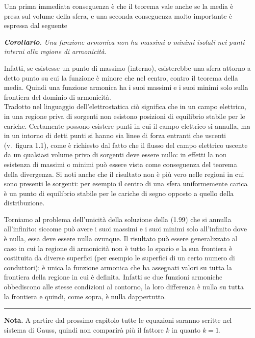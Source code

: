 Una prima immediata conseguenza \`e che il teorema vale anche se la media \`e
presa sul volume della sfera, e una seconda conseguenza molto importante \`e
espressa dal seguente

\textbf{\textit{Corollario.}} \textit{Una funzione armonica non ha massimi o
minimi isolati nei punti interni alla regione di armonicit\`a.}

Infatti, se esistesse un punto di massimo (interno), esisterebbe una sfera
attorno a detto punto su cui la funzione \`e minore che nel centro, contro il
teorema della media. Quindi una funzione armonica ha i suoi massimi e i suoi
minimi solo sulla frontiera del dominio di armonicit\`a.\\
Tradotto nel linguaggio dell'elettrostatica ci\`o significa che in un campo
elettrico, in una regione priva di sorgenti non esistono posizioni di equilibrio
stabile per le cariche. Certamente possono esistere punti in cui il campo
elettrico si annulla, ma in un intorno di detti punti si hanno sia linee di
forza entranti che uscenti (v.\ figura 1.1), come \`e richiesto dal fatto che il
flusso del campo elettrico uscente da un qualsiasi volume privo di sorgenti deve
essere nullo: in effetti la non esistenza di massimi o minimi pu\`o essere vista
come conseguenza del teorema della divergenza. Si noti anche che il risultato
non \`e pi\`u vero nelle regioni in cui sono presenti le sorgenti: per esempio
il centro di una sfera uniformemente carica \`e un punto di equilibrio stabile
per le cariche di segno opposto a quello della distribuzione.

Torniamo al problema dell'unicit\`a della soluzione della (1.99) che si annulla
all'infinito: siccome pu\`o avere i suoi massimi e i suoi minimi solo
all'infinito dove \`e nulla, essa deve essere nulla ovunque. Il risultato pu\`o
essere generalizzato al caso in cui la regione di armonicit\`a non \`e tutto lo
spazio e la sua frontiera \`e costituita da diverse superfici (per esempio le
superfici di un certo numero di conduttori): \`e unica la funzione armonica che
ha assegnati valori su tutta la frontiera della regione in cui \`e definita.
Infatti se due funzioni armoniche obbediscono alle stesse condizioni al
contorno, la loro differenza \`e nulla su tutta la frontiera e quindi, come
sopra, \`e nulla dappertutto.

\bigskip
\noindent\rule{5cm}{0.4pt}

\textbf{Nota.} A partire dal prossimo capitolo tutte le equazioni saranno
scritte nel sistema di Gauss, quindi non comparir\`a pi\`u il fattore $k$ in
quanto $k=1$.
